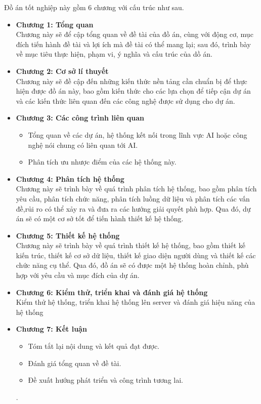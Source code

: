 Đồ án tốt nghiệp này gồm 6 chương với cấu trúc như sau.
\begin{itemize}
    \item \textbf{Chương 1: Tổng quan}\\
Chương này sẽ để cập tổng quan về đề tài của đồ án, cùng với động cơ, mục đích tiến hành đề tài và lợi ích mà đề tài có thể mang lại; sau đó, trình bày về mục tiêu thực hiện, phạm vi, ý nghĩa và cấu trúc của dồ án.
    \item \textbf{Chương 2: Cơ sở lí thuyết}\\
Chương này sẽ đề cập đến những kiến thức nền tảng cần chuẩn bị để thực hiện được đồ án này, bao gồm kiến thức cho các lựa chọn để tiếp cận dự án và các kiến thức liên quan đến các công nghệ được sử dụng cho dự án.
    \item \textbf{Chương 3: Các công trình liên quan}
    \begin{itemize}
        \item[$\circ$] Tổng quan về các dự án, hệ thống kết nối trong lĩnh vực AI hoặc công nghệ nói chung có liên quan tới AI.
        \item[$\circ$] Phân tích ưu nhược điểm của các hệ thống này.
    \end{itemize}
    \item \textbf{Chương 4: Phân tích hệ thống}\\
Chương này sẽ trình bày về quá trình phân tích hệ thống, bao gồm phân tích yêu cầu, phân tích chức năng, phân tích luồng dữ liệu và phân tích các vấn đề,rủi ro có thể xảy ra và đưa ra các hướng giải quyết phù hợp. Qua đó, dự án sẽ có một cơ sở tốt để tiến hành thiết kế hệ thống.
    \item \textbf{Chương 5: Thiết kế hệ thống}\\
Chương này sẽ trình bày về quá trình thiết kế hệ thống, bao gồm thiết kế kiến trúc, thiết kế cơ sở dữ liệu, thiết kế giao diện người dùng và thiết kế các chức năng cụ thể. Qua đó, đồ án sẽ có được một hệ thống hoàn chỉnh, phù hợp với yêu cầu và mục đích của dự án.
    \item \textbf{Chương 6: Kiểm thử, triển khai và đánh giá hệ thống}\\
    Kiểm thử hệ thống, triển khai hệ thống lên server và đánh giá hiệu năng của hệ thống
    \item \textbf{Chương 7: Kết luận}
    \begin{itemize}
        \item[$\circ$] Tóm tắt lại nội dung và kết quả đạt được.
        \item[$\circ$] Đánh giá tổng quan về đề tài.
        \item[$\circ$] Đề xuất hướng phát triển và công trình tương lai.
    \end{itemize}
    .
\end{itemize}

